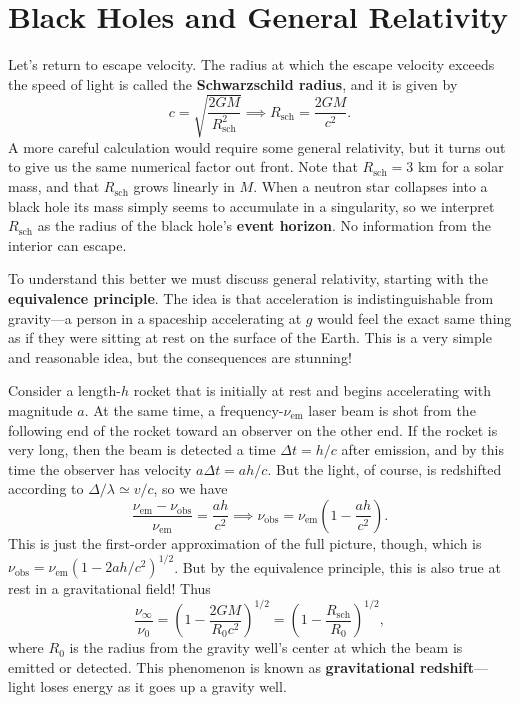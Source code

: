 \documentclass[../a062main.tex]{subfiles}
\begin{document}
\section{Black Holes and General Relativity}
Let's return to escape velocity.
The radius at which the escape velocity exceeds the speed of light is called the \textbf{Schwarzschild radius}, and it is given by
\[ c = \sqrt{\frac{2GM}{R_\textrm{sch}^2}} \implies \boxed{R_\textrm{sch} = \frac{2GM}{c^2}}. \]
A more careful calculation would require some general relativity, but it turns out to give us the same numerical factor out front.
Note that $R_\textrm{sch} = 3\textrm{ km}$ for a solar mass, and that $R_\textrm{sch}$ grows linearly in $M$.
When a neutron star collapses into a black hole its mass simply seems to accumulate in a singularity, so we interpret $R_\textrm{sch}$ as the radius of the black hole's \textbf{event horizon}.
No information from the interior can escape.

To understand this better we must discuss general relativity, starting with the \textbf{equivalence principle}.
The idea is that acceleration is indistinguishable from gravity---a person in a spaceship accelerating at $g$ would feel the exact same thing as if they were sitting at rest on the surface of the Earth.
This is a very simple and reasonable idea, but the consequences are stunning!

Consider a length-$h$ rocket that is initially at rest and begins accelerating with magnitude $a$.
At the same time, a frequency-$\nu_\textrm{em}$ laser beam is shot from the following end of the rocket toward an observer on the other end.
If the rocket is very long, then the beam is detected a time $\Delta t = h / c$ after emission, and by this time the observer has velocity $a \Delta t = ah / c$.
But the light, of course, is redshifted according to $\Delta / \lambda \simeq v / c$, so we have
\[ \frac{\nu_\textrm{em} - \nu_\textrm{obs}}{\nu_\textrm{em}} = \frac{ah}{c^2} \implies \nu_\textrm{obs} = \nu_\textrm{em} \left( 1 - \frac{ah}{c^2} \right). \]
This is just the first-order approximation of the full picture, though, which is $\nu_\textrm{obs} = \nu_\textrm{em} \left( 1 - 2ah / c^2 \right)^{1 / 2}$.
But by the equivalence principle, this is also true at rest in a gravitational field!
Thus
\[ \boxed{\frac{\nu_\infty}{\nu_0} = \left( 1 - \frac{2GM}{R_0c^2} \right)^{1 / 2} = \left( 1 - \frac{R_\textrm{sch}}{R_0} \right)^{1 / 2}}, \]
where $R_0$ is the radius from the gravity well's center at which the beam is emitted or detected.
This phenomenon is known as \textbf{gravitational redshift}---light loses energy as it goes up a gravity well.
\end{document}
